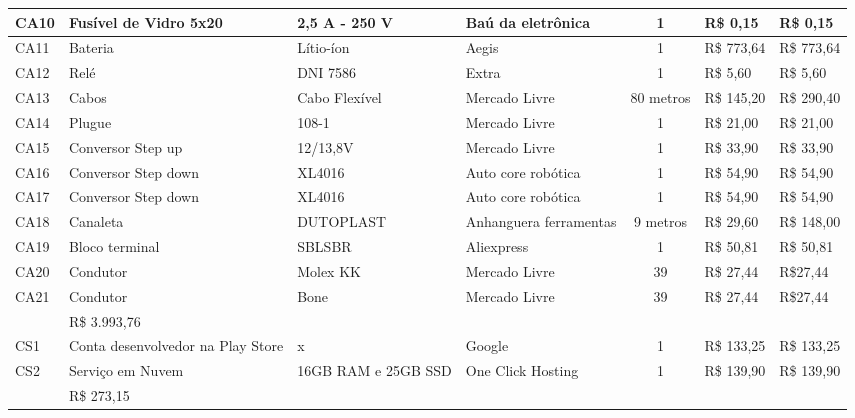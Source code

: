 \begin{table}[H]
\begin{adjustbox}{max width = 1\textwidth}
\begin{tabular}{|l|G{4cm}|C{2.4cm}|L{3.2cm}|c|l|l|}
        CA10 & Fusível de Vidro 5x20  & 2,5 A - 250 V & Baú da eletrônica & 1 & R\$ 0,15  & R\$ 0,15 \\\hline
        CA11 & Bateria  & Lítio-íon & Aegis & 1 & R\$ 773,64  & R\$ 773,64 \\\hline
        CA12 & Relé & DNI 7586 & Extra & 1 & R\$ 5,60  & R\$ 5,60 \\\hline
        CA13 & Cabos & Cabo Flexível & Mercado Livre & 80 metros & R\$ 145,20  & R\$ 290,40 \\\hline
        CA14 & Plugue & 108-1 & Mercado Livre & 1 & R\$ 21,00  & R\$ 21,00 \\\hline
        CA15 & Conversor Step up & 12/13,8V & Mercado Livre & 1 & R\$ 33,90  & R\$ 33,90 \\\hline
        CA16 & Conversor Step down & XL4016  & Auto core robótica & 1 & R\$ 54,90  & R\$ 54,90 \\\hline
        CA17 & Conversor Step down & XL4016  & Auto core robótica & 1 & R\$ 54,90  & R\$ 54,90 \\\hline
        CA18 & Canaleta & DUTOPLAST  & Anhanguera ferramentas & 9 metros & R\$ 29,60  & R\$ 148,00 \\\hline
        CA19 & Bloco terminal & SBLSBR  & Aliexpress & 1 & R\$ 50,81  & R\$ 50,81 \\\hline
        CA20 & Condutor & Molex KK  & Mercado Livre & 39 & R\$ 27,44  & R\$27,44 \\\hline
        CA21 & Condutor & Bone  & Mercado Livre & 39 & R\$ 27,44  & R\$27,44 \\\hline
        
        
         & R\$ 3.993,76 \\ \hline
        CS1 & Conta desenvolvedor na Play Store &  x  & Google & 1 & R\$ 133,25 & R\$ 133,25  \\\hline
        CS2 & Serviço em Nuvem  & 16GB RAM e 25GB SSD   & One Click Hosting  & 1  & R\$ 139,90 & R\$ 139,90 \\\hline
         & R\$ 273,15  \\ \hline
        

\end{tabular}
\end{adjustbox}
\end{table}
